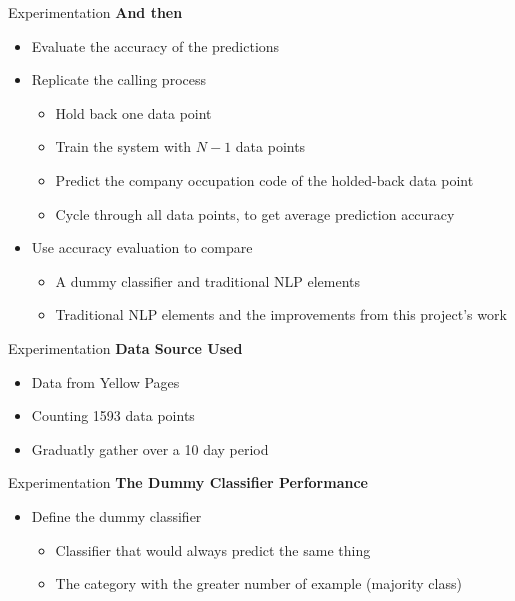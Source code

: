 
\begin{frame}[label=exp]{Experimentation}
	\textbf{And then}
	
	\begin{itemize}
	\item Evaluate the accuracy of the predictions
	\item Replicate the calling process
		\begin{itemize}
			\item Hold back one data point
			\item Train the system with $N-1$ data points
			\item Predict the company occupation code of the holded-back data point
			\item Cycle through all data points, to get average prediction accuracy
		\end{itemize}
	\item Use accuracy evaluation to compare
		\begin{itemize}
			\item A dummy classifier and traditional NLP elements
			\item Traditional NLP elements and the improvements from this project's work
		\end{itemize}
	\end{itemize}
	
\end{frame}

\begin{frame}[label=exp]{Experimentation}
	\textbf{Data Source Used}
	
	\begin{itemize}
		\item Data from Yellow Pages
		\item Counting 1593 data points
		\item Graduatly gather over a 10 day period
	\end{itemize}
	
\end{frame}



\begin{frame}[label=exp]{Experimentation}
	\textbf{The Dummy Classifier Performance}
	
	\begin{itemize}
		\item Define the dummy classifier 
		\begin{itemize}
			\item Classifier that would always predict the same thing \item The category with the greater number of example (majority class)
		\end{itemize}
		
	\end{itemize}
	
\end{frame}

